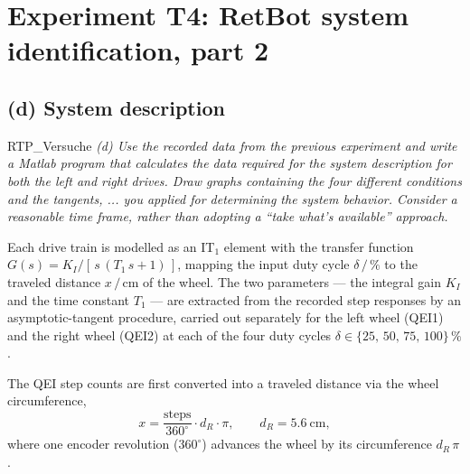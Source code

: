 \documentclass[12pt, oneside, a4paper]{scrreprt}
\begin{document}

    \chapter{Experiment T4: RetBot system identification, part 2}\label{ch:ExperimentT4}
        \section{(d) System description}\label{sec:d-system-description}

            \begin{displaycquote}{RTP_Versuche}
                \footnotesize{\textit{(d) Use the recorded data from the previous experiment and write a Matlab program that calculates the data required for the system description for both the left and right drives. Draw graphs containing the four different conditions and the tangents, ... you applied for determining the system behavior. Consider a reasonable time frame, rather than adopting a ``take what's available'' approach.}} 
            \end{displaycquote}\label{task(d)}

            Each drive train is modelled as an IT$_1$ element with the transfer function $G(s) = K_I / [\,s\,(T_1\,s + 1)\,]$, mapping the input duty cycle $\delta\,/\,\%$ to the traveled distance $x\,/\,\mathrm{cm}$ of the wheel. The two parameters --- the integral gain $K_I$ and the time constant $T_1$ --- are extracted from the recorded step responses by an asymptotic-tangent procedure, carried out separately for the left wheel (QEI1) and the right wheel (QEI2) at each of the four duty cycles $\delta \in \{25,\,50,\,75,\,100\}\,\%$.

            The QEI step counts are first converted into a traveled distance via the wheel circumference,
            \begin{equation}
                x = \frac{\text{steps}}{360^\circ} \cdot d_R \cdot \pi, \qquad d_R = \SI{5.6}{\cm},
                \label{eq:weg_aus_winkel}
            \end{equation}
            where one encoder revolution ($360^\circ$) advances the wheel by its circumference $d_R\,\pi$.
\end{document}
